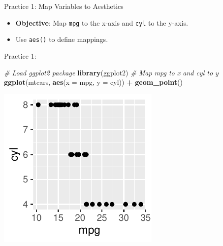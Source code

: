 \documentclass[
  ignorenonframetext,
]{beamer}
\newenvironment{Shaded}{\begin{snugshade}}{\end{snugshade}}
\newcommand{\AttributeTok}[1]{\textcolor[rgb]{0.13,0.29,0.53}{#1}}
\newcommand{\CommentTok}[1]{\textcolor[rgb]{0.56,0.35,0.01}{\textit{#1}}}
\newcommand{\FunctionTok}[1]{\textcolor[rgb]{0.13,0.29,0.53}{\textbf{#1}}}
\newcommand{\NormalTok}[1]{#1}
\newcommand{\SpecialCharTok}[1]{\textcolor[rgb]{0.81,0.36,0.00}{\textbf{#1}}}
\providecommand{\tightlist}{%
  \setlength{\itemsep}{0pt}\setlength{\parskip}{0pt}}
\begin{document}
\begin{frame}[fragile]{Practice 1: Map Variables to Aesthetics}
\label{practice-1-map-variables-to-aesthetics}
\begin{itemize}
\tightlist
\item
  \textbf{Objective}: Map \texttt{mpg} to the x-axis and \texttt{cyl} to
  the y-axis.
\item
  Use \texttt{aes()} to define mappings.
\end{itemize}
\end{frame}

\begin{frame}[fragile]{Practice 1:}
\label{practice-1}

\begin{Shaded}
\begin{Highlighting}[]
\CommentTok{\# Load ggplot2 package}
\FunctionTok{library}\NormalTok{(ggplot2)}
\CommentTok{\# Map mpg to x and cyl to y}
\FunctionTok{ggplot}\NormalTok{(mtcars, }\FunctionTok{aes}\NormalTok{(}\AttributeTok{x =}\NormalTok{ mpg, }\AttributeTok{y =}\NormalTok{ cyl)) }\SpecialCharTok{+} \FunctionTok{geom\_point}\NormalTok{()}
\end{Highlighting}
\end{Shaded}

\begin{center}\includegraphics[width=0.5\linewidth]{Figs/unnamed-chunk-10-1} \end{center}
\end{frame}
\end{document}
